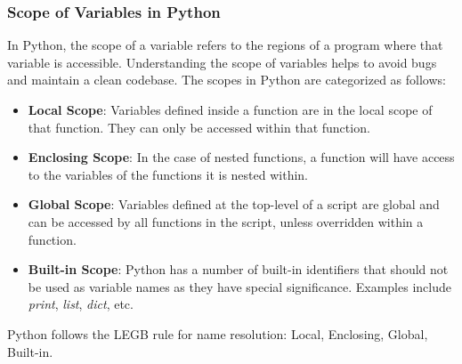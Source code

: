 \begin{frame}
  \frametitle{Scope of Variables in Python}

  In Python, the scope of a variable refers to the regions of a program where that variable is accessible. Understanding the scope of variables helps to avoid bugs and maintain a clean codebase. The scopes in Python are categorized as follows:

  \begin{itemize}
    \item \textbf{Local Scope}: Variables defined inside a function are in the local scope of that function. They can only be accessed within that function.
    \item \textbf{Enclosing Scope}: In the case of nested functions, a function will have access to the variables of the functions it is nested within.
    \item \textbf{Global Scope}: Variables defined at the top-level of a script are global and can be accessed by all functions in the script, unless overridden within a function.
    \item \textbf{Built-in Scope}: Python has a number of built-in identifiers that should not be used as variable names as they have special significance. Examples include \textit{print}, \textit{list}, \textit{dict}, etc.
  \end{itemize}
  
  Python follows the LEGB rule for name resolution: Local, Enclosing, Global, Built-in.
\end{frame}

